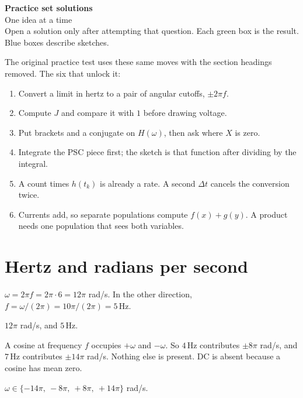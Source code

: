 \documentclass[11pt,letterpaper]{article}
\newcommand{\ans}[1]{\par\vspace{2pt}{\bfseries #1}\quad}
\begin{document}
\begin{center}
{\Large\bfseries Practice set solutions}\\[2pt]
{\large One idea at a time}\\[4pt]
Open a solution only after attempting that question. Each green box is the result. Blue boxes describe sketches.
\end{center}

The original practice test uses these same moves with the section headings removed. The six that unlock it:

\begin{enumerate}[leftmargin=1.4em]
\item Convert a limit in hertz to a pair of angular cutoffs, $\pm 2\pi f$.
\item Compute $J$ and compare it with $1$ before drawing voltage.
\item Put brackets and a conjugate on $H(\omega)$, then ask where $X$ is zero.
\item Integrate the PSC piece first; the sketch is that function after dividing by the integral.
\item A count times $h(t_k)$ is already a rate. A second $\Delta t$ cancels the conversion twice.
\item Currents add, so separate populations compute $f(x)+g(y)$. A product needs one population that sees both variables.
\end{enumerate}

\section{Hertz and radians per second}

\ans{1.}
$\omega = 2\pi f = 2\pi\cdot 6 = 12\pi$ rad/s. In the other direction, $f = \omega/(2\pi) = 10\pi/(2\pi) = 5\,\mathrm{Hz}$.
\begin{result}
$12\pi$ rad/s, and $5\,\mathrm{Hz}$.
\end{result}

\ans{2.}
A cosine at frequency $f$ occupies $+\omega$ and $-\omega$. So $4\,\mathrm{Hz}$ contributes $\pm 8\pi$ rad/s, and $7\,\mathrm{Hz}$ contributes $\pm 14\pi$ rad/s. Nothing else is present. DC is absent because a cosine has mean zero.
\begin{result}
$\omega \in \{-14\pi,\ -8\pi,\ +8\pi,\ +14\pi\}$ rad/s.
\end{result}
\end{document}
